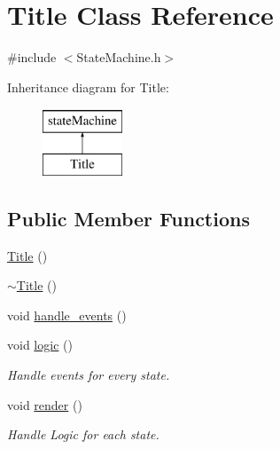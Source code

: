 \hypertarget{class_title}{\section{Title Class Reference}
\label{class_title}
}


{\ttfamily \#include $<$State\-Machine.\-h$>$}

Inheritance diagram for Title\-:\begin{figure}[H]
\begin{center}
\leavevmode
\includegraphics[height=2.000000cm]{class_title}
\end{center}
\end{figure}
\subsection*{Public Member Functions}
\begin{DoxyCompactItemize}
\item 
\hyperlink{class_title_a56ca0b368a213295649d75c62577e4bb}{Title} ()
\item 
\hyperlink{class_title_aa0423651e6010e406b1c1052724b785c}{$\sim$\-Title} ()
\item 
void \hyperlink{class_title_a679fe0df9fda9088027619dc1bed3780}{handle\-\_\-events} ()
\item 
void \hyperlink{class_title_a530e17f16f634a0385a8d37ed6a57104}{logic} ()
\begin{DoxyCompactList}\small\item\em Handle events for every state. \end{DoxyCompactList}\item 
void \hyperlink{class_title_a4a9fe899fdb92d6d82bbb88b949cdeaf}{render} ()
\begin{DoxyCompactList}\small\item\em Handle Logic for each state. \end{DoxyCompactList}\end{DoxyCompactItemize}


